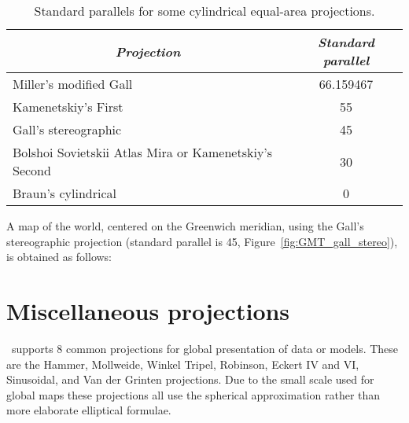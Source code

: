 \begin{table}[h]
\centering
\begin{tabular}{lc} \hline
\multicolumn{1}{c}{\emph{Projection}}	&
\multicolumn{1}{c}{\emph{Standard parallel}} \\ \hline
Miller's modified Gall		&	66.159467\DS\\
Kamenetskiy's First		&	55\DS\\
Gall's stereographic		&	45\DS\\
Bolshoi Sovietskii Atlas Mira or Kamenetskiy's Second	&	30\DS\\
Braun's cylindrical		&	0\DS\\\hline
\end{tabular}
\caption{Standard parallels for some cylindrical equal-area projections.}
\label{tbl:JCylstere}
\end{table}

A map of the world, centered on the Greenwich meridian, using the Gall's stereographic projection (standard parallel is 45\DS, Figure~\ref{fig:GMT_gall_stereo}), is obtained as follows:






\clearpage
\section{Miscellaneous projections}

\GMT\ supports 8 common projections for global presentation
of data or models.  These are the Hammer, Mollweide, Winkel
Tripel, Robinson, Eckert IV and VI, Sinusoidal, and Van der
Grinten projections.
Due to the small scale used for global maps these projections
all use the spherical approximation rather than more
elaborate elliptical formulae.

